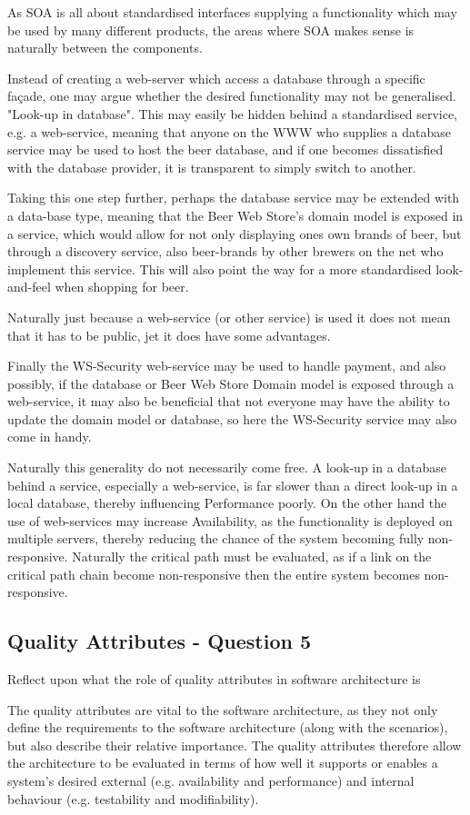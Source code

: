 As SOA is all about standardised interfaces supplying a functionality which may be used by many different products, the areas where SOA makes sense is naturally between the components. 

Instead of creating a web-server which access a database through a specific fa\c cade, one may argue whether the desired functionality may not be generalised. "Look-up in database". This may easily be hidden behind a standardised service, e.g. a web-service, meaning that anyone on the WWW who supplies a database service may be used to host the beer database, and if one becomes dissatisfied with the database provider, it is transparent to simply switch to another. 

Taking this one step further, perhaps the database service may be extended with a data-base type, meaning that the Beer Web Store's domain model is exposed in a service, which would allow for not only displaying ones own brands of beer, but through a discovery service, also beer-brands by other brewers on the net who implement this service. This will also point the way for a more standardised look-and-feel when shopping for beer.

Naturally just because a web-service (or other service) is used it does not mean that it has to be public, jet it does have some advantages.

Finally the WS-Security web-service may be used to handle payment, and also possibly, if the database or Beer Web Store Domain model is exposed through a web-service, it may also be beneficial that not everyone may have the ability to update the domain model or database, so here the WS-Security service may also come in handy.

Naturally this generality do not necessarily come free. A look-up in a database behind a service, especially a web-service, is far slower than a direct look-up in a local database, thereby influencing Performance poorly. On the other hand the use of web-services may increase Availability, as the functionality is deployed on multiple servers, thereby reducing the chance of the system becoming fully non-responsive. Naturally the critical path must be evaluated, as if a link on the critical path chain become non-responsive then the entire system becomes non-responsive.

\subsection{Quality Attributes - Question 5}

\begin{question}
Reflect upon what the role of quality attributes in software
architecture is
\end{question}

The quality attributes are vital to the software architecture, as they not only define the requirements to the software architecture (along with the scenarios), but also describe their relative importance. The quality attributes therefore allow the architecture to be evaluated in terms of how well it supports or enables a system's desired external (e.g. availability and performance) and internal behaviour (e.g. testability and modifiability). \cite{h_sarjoughian2002}
